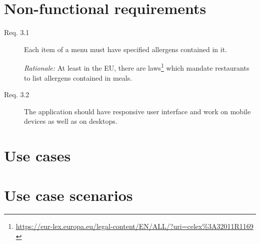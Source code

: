 \section{Non-functional requirements}
\begin{description}
    \item [Req. 3.1] Each item of a menu must have specified allergens contained in it.
    
    \emph{Rationale:} At least in the EU, there are laws\footnote{\url{https://eur-lex.europa.eu/legal-content/EN/ALL/?uri=celex\%3A32011R1169}  \label{fnlabel}} which mandate restaurants to list allergens contained in meals.
    \item [Req. 3.2] The application should have responsive user interface and work on mobile devices as well as on desktops.
\end{description}

\section{Use cases}

\section{Use case scenarios}